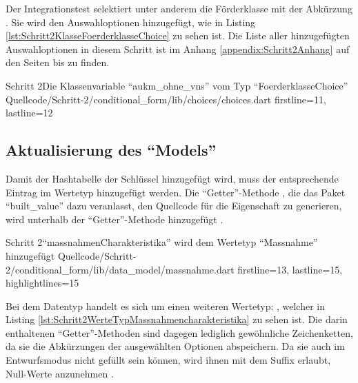 Der Integrationstest selektiert unter anderem die Förderklasse mit der Abkürzung . Sie wird den Auswahloptionen hinzugefügt, wie in Listing \ref{lst:Schritt2KlasseFoerderklasseChoice} zu sehen ist.
Die Liste aller hinzugefügten Auswahloptionen in diesem Schritt ist im Anhang \ref{appendix:Schritt2Anhang} auf den Seiten \pageref{lst:Schritt2FoerderklasseChoicesKategorieChoices} bis \pageref{lst:Schritt2hauptzielsetzungLandChoices} zu finden.

\begin{alexlisting}{Schritt 2}{Die Klassenvariable \enquote{aukm_ohne_vns} vom Typ \enquote{FoerderklasseChoice}}
  {Quellcode/Schritt-2/conditional_form/lib/choices/choices.dart}
  {firstline=11, lastline=12}
  \label{lst:Schritt2KlasseFoerderklasseChoice}
\end{alexlisting}

\subsection{Aktualisierung des \enquote{Models}}

Damit der Hashtabelle der Schlüssel  hinzugefügt wird, muss der entsprechende Eintrag im Wertetyp  hinzugefügt werden.
Die \enquote{Getter}-Methode , die das Paket \enquote{built_value} dazu veranlasst,
den Quellcode für die Eigenschaft zu generieren, wird unterhalb der \enquote{Getter}-Methode  hinzugefügt .

\begin{alexlisting}{Schritt 2}{\enquote{massnahmenCharakteristika} wird dem Wertetyp \enquote{Massnahme} hinzugefügt}
  {Quellcode/Schritt-2/conditional_form/lib/data_model/massnahme.dart}
  {firstline=13, lastline=15, highlightlines={15}}
  \label{lst:Schritt2massnahmenCharakteristikaWirdMMassnahmeHinzugefuegt}
\end{alexlisting}

Bei dem Datentyp handelt es sich um einen weiteren Wertetyp: , welcher in Listing \ref{lst:Schritt2WerteTypMassnahmencharakteristika} zu sehen ist.
Die darin enthaltenen \enquote{Getter}-Methoden sind dagegen lediglich gewöhnliche Zeichenketten, da sie die Abkürzungen der ausgewählten Optionen abspeichern.
Da sie auch im Entwurfsmodus nicht gefüllt sein können, wird ihnen mit dem Suffix  erlaubt, Null-Werte anzunehmen .

